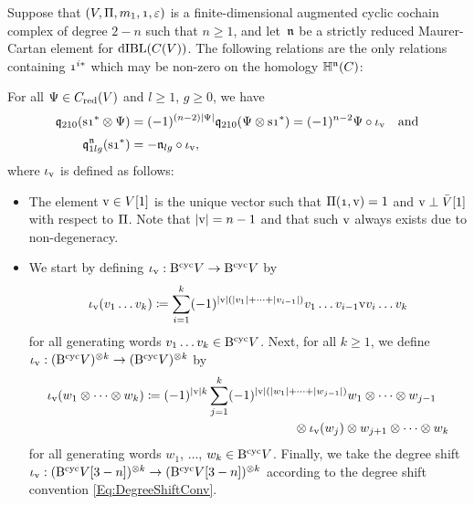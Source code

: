 \documentclass[\MainFolder/Text.tex]{subfiles}
\begin{document}
\begin{Proposition}\label{Prop:Ones}
Suppose that $(V,\Pair,m_1,\NOne,\varepsilon)$ is a finite-dimensional augmented cyclic cochain complex of degree $2-n$ such that $n\ge 1$, and let~$\mathfrak{n}$ be a strictly reduced Maurer-Cartan element for $\mathrm{dIBL}(C(V))$. The following relations are the only relations containing $\NOne^{i*}$ which may be non-zero on the homology $\mathbb{H}^{\mathfrak{n}}(C)$: 

For all $\Psi \in C_{\mathrm{red}}(V)$ and $l\ge 1$, $g\ge 0$, we have
\begin{align*}
\OPQ_{210}(\Susp\NOne^* \otimes \Psi) &= (-1)^{(n-2)\Abs{\Psi}} \OPQ_{210}(\Psi \otimes \Susp\NOne^*)  = (-1)^{n-2}\Psi \circ \iota_\NVol\quad\text{and} \\[\jot]
\OPQ_{1lg}^\PMC(\Susp\NOne^*) & = - \PMC_{lg} \circ \iota_\NVol,
\end{align*}
where $\iota_{\mathrm{v}}$ is defined as follows:
\begin{itemize}
\item The element $\mathrm{v} \in V[1]$ is the unique vector such that $\Pair(\NOne,\NVol) = 1$ and $\mathrm{v} \perp \bar{V}[1]$ with respect to $\Pi$. Note that $|\mathrm{v}| = n-1$ and that such $\mathrm{v}$ always exists due to non-degeneracy.
\item We start by defining $\iota_{\mathrm{v}} : \mathrm{B}^{\mathrm{cyc}} V \rightarrow \mathrm{B}^{\mathrm{cyc}} V$ by
$$ \iota_{\mathrm{v}}(v_1\dots v_k) \coloneqq \sum_{i=1}^k (-1)^{|\mathrm{v}|(|v_1| + \dotsb + |v_{i-1}|)} v_1 \dots v_{i-1} \mathrm{v} v_i \dots v_k $$
for all generating words $v_1 \dots v_k \in \mathrm{B}^{\mathrm{cyc}} V$. Next, for all $k\ge 1$, we define $\iota_{\mathrm{v}} : (\mathrm{B}^{\mathrm{cyc}} V)^{\otimes k} \rightarrow (\mathrm{B}^{\mathrm{cyc}} V)^{\otimes k}$ by
$$ \iota_\NVol(w_1 \otimes \dotsb \otimes w_k) \coloneqq  \begin{multlined}[t](-1)^{\Abs{\NVol}k}\sum_{j=1}^k (-1)^{\Abs{\NVol}(\Abs{w_1} + \dotsb + \Abs{w_{j-1}})} w_1 \otimes \dotsb \otimes w_{j-1} \\ \otimes  \iota_\NVol(w_j) \otimes w_{j+1} \otimes \dotsb \otimes w_k \end{multlined}$$
for all generating words $w_1$, $\dotsc$, $w_k \in \mathrm{B}^{\mathrm{cyc}} V$. Finally, we take the degree shift $\iota_{\mathrm{v}}: (\mathrm{B}^{\mathrm{cyc}} V[3-n])^{\otimes k} \rightarrow (\mathrm{B}^{\mathrm{cyc}} V[3-n])^{\otimes k}$ according to the degree shift convention \eqref{Eq:DegreeShiftConv}. 
\end{itemize}
\end{Proposition}
\end{document}
